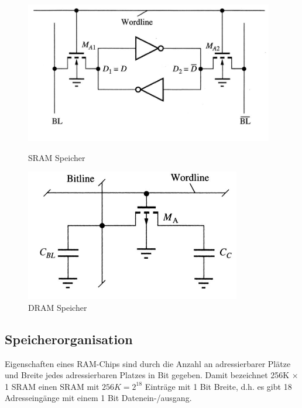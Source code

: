 \documentclass[a4paper,12pt,leqno]{article}
\begin{document}
\begin{figure}[h!]
   \begin{minipage}[b]{.4\linewidth} %
      \includegraphics[width=\linewidth]{Grafiken/SRAM.png}
      \caption{SRAM Speicher}
   \end{minipage}
   \hspace{.1\linewidth}%
   \begin{minipage}[b]{.4\linewidth} %
      \includegraphics[width=\linewidth]{Grafiken/DRAM.png}
      \caption{DRAM Speicher}
   \end{minipage}
\end{figure}

\subsection{Speicherorganisation}

Eigenschaften eines RAM-Chips sind durch die Anzahl an adressierbarer Plätze und Breite jedes adressierbaren Platzes in Bit gegeben.
Damit bezeichnet 256K $\times$ 1 SRAM einen SRAM mit $256K = 2^{18}$ Einträge mit 1 Bit Breite, d.h. es gibt 18 Adresseingänge mit einem 1 Bit Datenein-/ausgang.
\end{document}
